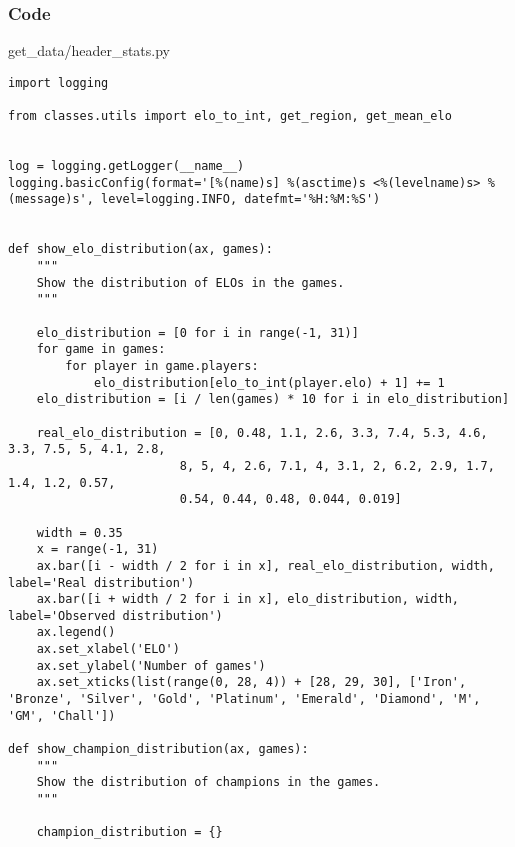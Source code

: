 \documentclass{beamer}
\begin{document}

\begin{frame}[fragile]
    \frametitle{Code}
    \scriptsize
    get\_data/header\_stats.py \newline
    \fontsize{3pt}{5pt}\selectfont
    \begin{verbatim}
import logging

from classes.utils import elo_to_int, get_region, get_mean_elo


log = logging.getLogger(__name__)
logging.basicConfig(format='[%(name)s] %(asctime)s <%(levelname)s> %(message)s', level=logging.INFO, datefmt='%H:%M:%S')


def show_elo_distribution(ax, games):
    """
    Show the distribution of ELOs in the games.
    """

    elo_distribution = [0 for i in range(-1, 31)]
    for game in games:
        for player in game.players:
            elo_distribution[elo_to_int(player.elo) + 1] += 1
    elo_distribution = [i / len(games) * 10 for i in elo_distribution]
    
    real_elo_distribution = [0, 0.48, 1.1, 2.6, 3.3, 7.4, 5.3, 4.6, 3.3, 7.5, 5, 4.1, 2.8,
                        8, 5, 4, 2.6, 7.1, 4, 3.1, 2, 6.2, 2.9, 1.7, 1.4, 1.2, 0.57, 
                        0.54, 0.44, 0.48, 0.044, 0.019]
    
    width = 0.35
    x = range(-1, 31)
    ax.bar([i - width / 2 for i in x], real_elo_distribution, width, label='Real distribution')
    ax.bar([i + width / 2 for i in x], elo_distribution, width, label='Observed distribution')
    ax.legend()
    ax.set_xlabel('ELO')
    ax.set_ylabel('Number of games')
    ax.set_xticks(list(range(0, 28, 4)) + [28, 29, 30], ['Iron', 'Bronze', 'Silver', 'Gold', 'Platinum', 'Emerald', 'Diamond', 'M', 'GM', 'Chall'])

def show_champion_distribution(ax, games):
    """
    Show the distribution of champions in the games.
    """
    
    champion_distribution = {}
    \end{verbatim}
\end{frame}
\end{document}
